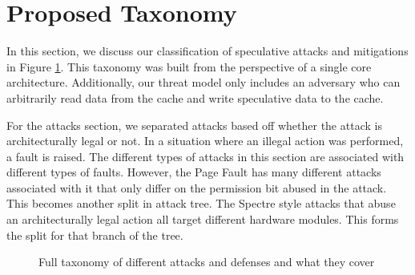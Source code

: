 \section{Proposed Taxonomy} \label{Proposed Taxonomy}

In this section, we discuss our classification of speculative attacks and mitigations in Figure \ref{fig:categorization}.
This taxonomy was built from the perspective of a single core architecture.
Additionally, our threat model only includes an adversary who can arbitrarily read data from the cache and write speculative data to the cache.

For the attacks section, we separated attacks based off whether the attack is architecturally legal or not.
In a situation where an illegal action was performed, a fault is raised.
The different types of attacks in this section are associated with different types of faults.
However, the Page Fault has many different attacks associated with it that only differ on the permission bit abused in the attack.
This becomes another split in attack tree.
The Spectre style attacks that abuse an architecturally legal action all target different hardware modules.
This forms the split for that branch of the tree.

\begin{center}
\begin{figure}[hbtp]
	\caption{Full taxonomy of different attacks and defenses and what they cover \cite{b2, b3, b4, b8, b36, b14, b15, b16, b17, b18, b19, b20, b21, b22, b23, b24, b25, b26, b27, b28, b29, b31, b32, b33, b38, b39, b40, b41, b42, b43, b44, b45, b46}}
    \label{fig:categorization}
\end{figure}
\afterpage{\clearpage}
\end{center}

